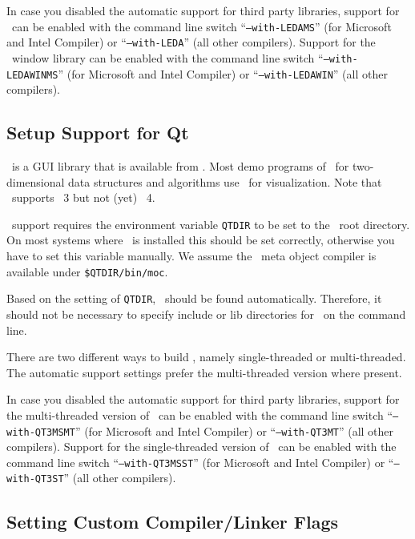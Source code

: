 In case you disabled the automatic support for third party libraries,
support for \leda\ can be enabled with the command line switch
``\texttt{--with-LEDAMS}'' (for Microsoft and Intel Compiler) or
``\texttt{--with-LEDA}'' (all other compilers). Support for the \leda\
window library can be enabled with the command line switch
``\texttt{--with-LEDAWINMS}'' (for Microsoft and Intel Compiler) or
``\texttt{--with-LEDAWIN}'' (all other compilers).

\subsection{Setup Support for Qt\label{sec:qt-setup}}

\qt\ is a GUI library that is available from \qtpage. Most demo
programs of \cgal\ for two-dimensional data structures and algorithms
use \qt\ for visualization. Note that \cgal\ supports \qt~3 but not
(yet) \qt~4.

\qt\ support requires the environment variable \texttt{QTDIR} to be
set to the \qt\ root directory. On most systems where \qt\ is
installed this should be set correctly, otherwise you have to set this
variable manually. We assume the \qt\ meta object compiler is
available under \texttt{\${QTDIR}/bin/moc}.

Based on the setting of \texttt{QTDIR}, \qt\ should be found
automatically. Therefore, it should not be necessary to specify
include or lib directories for \qt\ on the command line.

There are two different ways to build \qt, namely single-threaded or
multi-threaded. The automatic support settings prefer the
multi-threaded version where present.

In case you disabled the automatic support for third party libraries,
support for the multi-threaded version of \qt\ can be enabled with the
command line switch ``\texttt{--with-QT3MSMT}'' (for Microsoft and
Intel Compiler) or ``\texttt{--with-QT3MT}'' (all other compilers).
Support for the single-threaded version of \qt\ can be enabled with
the command line switch ``\texttt{--with-QT3MSST}'' (for Microsoft and
Intel Compiler) or ``\texttt{--with-QT3ST}'' (all other compilers).

\subsection{Setting Custom Compiler/Linker Flags\label{sec:custom-setup}}
\index{compilers!setting custom flags}


